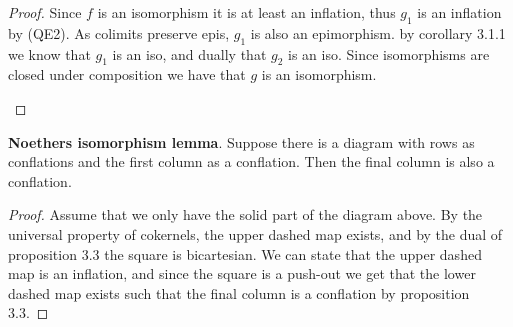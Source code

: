     \begin{proof}
        Since $f$ is an isomorphism it is at least an inflation, thus $g_1$ is an inflation by (QE2). As colimits preserve epis, $g_1$ is also an epimorphism. by corollary 3.1.1 we know that $g_1$ is an iso, and dually that $g_2$ is an iso. Since isomorphisms are closed under composition we have that $g$ is an isomorphism. 
        \begin{center}
        \end{center}
    \end{proof}

    \begin{lemma}
        \textbf{Noethers isomorphism lemma}. Suppose there is a diagram with rows as conflations and the first column as a conflation. Then the final column is also a conflation.
        \begin{center}
        \end{center}
    \end{lemma}

    \begin{proof}
        Assume that we only have the solid part of the diagram above. By the universal property of cokernels, the upper dashed map exists, and by the dual of proposition 3.3 the square is bicartesian. We can state that the upper dashed map is an inflation, and since the square is a push-out we get that the lower dashed map exists such that the final column is a conflation by proposition 3.3.
    \end{proof}

